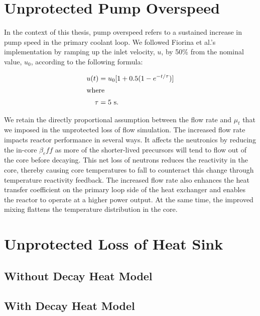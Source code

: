 \section{Unprotected Pump Overspeed}

In the context of this thesis, pump overspeed refers to a sustained
increase in pump speed in the primary coolant loop. We followed Fiorina et
al.'s implementation by ramping up the inlet velocity, $u$, by 50\% from
the nominal value, $u_0$, according to the following formula:

\begin{align}
    u(t) &= u_0 [1 + 0.5 (1 - e^{-t / \tau})] \\
    \intertext{where}
    \tau &= 5 \text{ s.} \nonumber
\end{align} 

We retain the directly proportional assumption between the flow rate and
$\mu_t$ that we imposed in the unprotected loss of flow simulation.
The increased flow rate impacts reactor performance in several ways.
It affects the neutronics by reducing the in-core $\beta_eff$ as more of the
shorter-lived precursors will tend to flow out of the core before decaying.
This net loss of neutrons reduces the reactivity in the core, thereby causing
core temperatures to fall to counteract this change through temperature
reactivity feedback. The increased flow rate also enhances the heat transfer
coefficient on the primary loop side of the heat exchanger and enables the
reactor to operate at a higher power output. At the same time, the improved
mixing flattens the temperature distribution in the core.

\section{Unprotected Loss of Heat Sink}



\subsection{Without Decay Heat Model}

\subsection{With Decay Heat Model}
